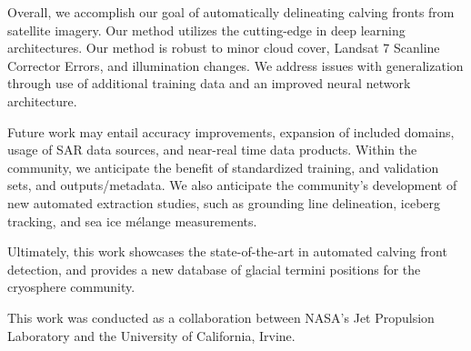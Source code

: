 \documentclass[tc, manuscript]{copernicus}
\begin{document}
Overall, we accomplish our goal of automatically delineating calving fronts from satellite imagery. Our method utilizes the cutting-edge in deep learning architectures. Our method is robust to minor cloud cover, Landsat 7 Scanline Corrector Errors, and illumination changes. We address issues with generalization through use of additional training data and an improved neural network architecture.

Future work may entail accuracy improvements, expansion of included domains, usage of SAR data sources, and near-real time data products. Within the community, we anticipate the benefit of standardized training, and validation sets, and outputs/metadata. We also anticipate the community's development of new automated extraction studies, such as grounding line delineation, iceberg tracking, and sea ice mélange measurements.

Ultimately, this work showcases the state-of-the-art in automated calving front detection, and provides a new database of glacial termini positions for the cryosphere community.






\begin{acknowledgements}
    This work was conducted as a collaboration between NASA’s Jet Propulsion Laboratory and the University of California, Irvine. 
\end{acknowledgements}


\end{document}

